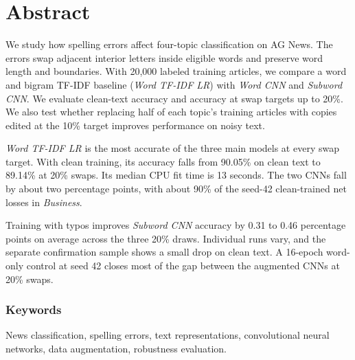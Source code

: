 \chapter*{Abstract}
We study how spelling errors affect four-topic classification on AG News. The errors swap adjacent interior letters inside eligible words and preserve word length and boundaries. With 20,000 labeled training articles, we compare a word and bigram TF-IDF baseline (\textit{Word TF-IDF LR}) with \textit{Word CNN} and \textit{Subword CNN}. We evaluate clean-text accuracy and accuracy at swap targets up to 20\%. We also test whether replacing half of each topic's training articles with copies edited at the 10\% target improves performance on noisy text.

\textit{Word TF-IDF LR} is the most accurate of the three main models at every swap target. With clean training, its accuracy falls from 90.05\% on clean text to 89.14\% at 20\% swaps. Its median CPU fit time is 13 seconds. The two CNNs fall by about two percentage points, with about 90\% of the seed-42 clean-trained net losses in \emph{Business}.

Training with typos improves \textit{Subword CNN} accuracy by 0.31 to 0.46 percentage points on average across the three 20\% draws. Individual runs vary, and the separate confirmation sample shows a small drop on clean text. A 16-epoch word-only control at seed 42 closes most of the gap between the augmented CNNs at 20\% swaps.

\subsection*{Keywords}
News classification, spelling errors, text representations, convolutional neural networks, data augmentation, robustness evaluation.
